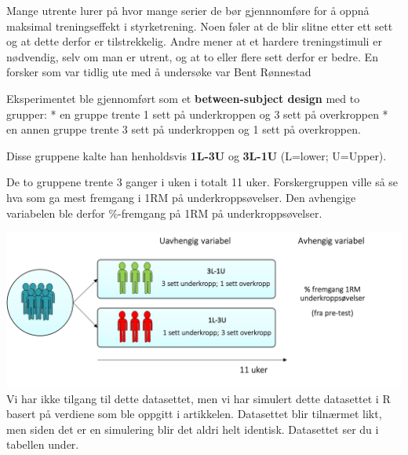 \documentclass[
]{book}
\begin{document}
Mange utrente lurer på hvor mange serier de bør gjennnomføre for å oppnå maksimal treningseffekt i styrketrening. Noen føler at de blir slitne etter ett sett og at dette derfor er tilstrekkelig. Andre mener at et hardere treningstimuli er nødvendig, selv om man er utrent, og at to eller flere sett derfor er bedre. En forsker som var tidlig ute med å undersøke var Bent Rønnestad \citep{ronnestad_dissimilar_2007}

Eksperimentet ble gjennomført som et \textbf{between-subject design} med to grupper:
* en gruppe trente 1 sett på underkroppen og 3 sett på overkroppen
* en annen gruppe trente 3 sett på underkroppen og 1 sett på overkroppen.

Disse gruppene kalte han henholdsvis \textbf{1L-3U} og \textbf{3L-1U} (L=lower; U=Upper).

De to gruppene trente 3 ganger i uken i totalt 11 uker. Forskergruppen ville så se hva som ga mest fremgang i 1RM på underkroppsøvelser. Den avhengige variabelen ble derfor \%-fremgang på 1RM på underkroppsøvelser.

\includegraphics{design.png}
Vi har ikke tilgang til dette datasettet, men vi har simulert dette datasettet i R basert på verdiene som ble oppgitt i artikkelen. Datasettet blir tilnærmet likt, men siden det er en simulering blir det aldri helt identisk. Datasettet ser du i tabellen under.
\end{document}
